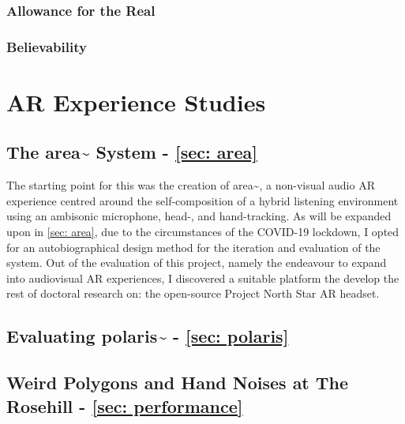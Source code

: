 \subsubsection{Allowance for the Real}
\subsubsection{Believability}



\section{AR Experience Studies}
\subsection{The area\textasciitilde{} System - \autoref{sec: area}}
The starting point for this was the creation of area\textasciitilde{}, a non-visual audio AR experience centred around the self-composition of a hybrid listening environment using an ambisonic microphone, head-, and hand-tracking. As will be expanded upon in \autoref{sec: area}, due to the circumstances of the COVID-19 lockdown, I opted for an autobiographical design method for the iteration and evaluation of the system. Out of the evaluation of this project, namely the endeavour to expand into audiovisual AR experiences, I discovered a suitable platform the develop the rest of doctoral research on: the open-source Project North Star AR headset.

\subsection{Evaluating polaris\textasciitilde{} - \autoref{sec: polaris}}
\subsection{Weird Polygons and Hand Noises at The Rosehill - \autoref{sec: performance}}

